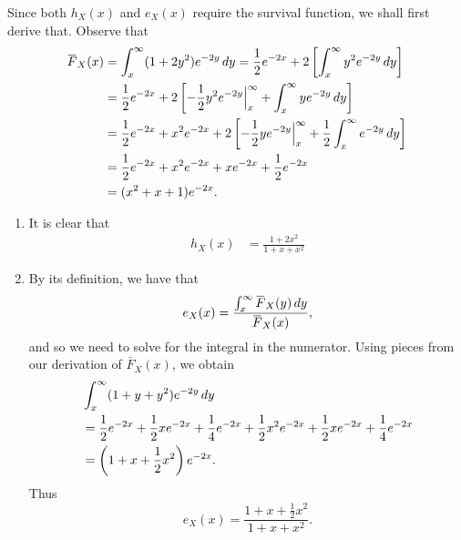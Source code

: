 \documentclass[notoc,notitlepage]{tufte-book}
\begin{document}
\begin{solution}
  Since both $h_X(x)$ and $e_X(x)$ require the survival function, we shall first derive that. Observe that
  \begin{align*}
    \bar{F}_X(x) &= \int_{x}^{\infty} (1 + 2y^2) e^{-2y} \dif{y} = \frac{1}{2} e^{-2x} + 2 \left[ \int_{x}^{\infty} y^2 e^{-2y} \dif{y} \right] \\
                 &= \frac{1}{2}e^{-2x} + 2 \left[ -\frac{1}{2} y^2 e^{-2y} \at{x}{\infty} + \int_{x}^{\infty} ye^{-2y} \dif{y} \right] \\
                 &= \frac{1}{2}e^{-2x} + x^2 e^{-2x} + 2 \left[ -\frac{1}{2}ye^{-2y} \at{x}{\infty} + \frac{1}{2} \int_{x}^{\infty} e^{-2y} \dif{y} \right] \\
                 &= \frac{1}{2}e^{-2x} + x^2 e^{-2x} + xe^{-2x} + \frac{1}{2}e^{-2x} \\
                 &= (x^2 + x + 1) e^{-2x}.
  \end{align*}
  \begin{enumerate}
    \item It is clear that
      \begin{align*}
        h_X(x) &= \frac{1 + 2x^2}{1 + x + x^2}
      \end{align*}

    \item By its definition, we have that
      \begin{equation*}
        e_X(x) = \frac{\int_{x}^{\infty} \bar{F}_X(y) \dif{y} }{\bar{F}_X(x)},
      \end{equation*}
      and so we need to solve for the integral in the numerator. Using pieces from our derivation of $\bar{F}_X(x)$, we obtain
      \begin{align*}
        &\int_{x}^{\infty} (1 + y + y^2) e^{-2y} \mathop{}\!d{y} \\
        &= \frac{1}{2}e^{-2x} + \frac{1}{2}xe^{-2x} + \frac{1}{4}e^{-2x} + \frac{1}{2}x^2 e^{-2x} + \frac{1}{2}xe^{-2x} + \frac{1}{4}e^{-2x} \\
        &= \left( 1 + x + \frac{1}{2}x^2 \right) e^{-2x}.
      \end{align*}
      Thus
      \begin{equation*}
        e_X(x) = \frac{1 + x + \frac{1}{2}x^2}{1 + x + x^2}.
      \end{equation*}


\end{enumerate}
\end{solution}
\end{document}
